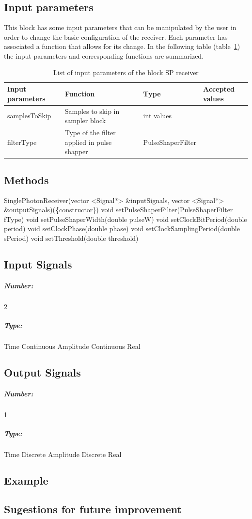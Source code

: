 \subsection*{Input parameters}

This block has some input parameters that can be manipulated by the user in order to change the basic configuration of the receiver. Each parameter has associated a function that allows for its change. In the following table (table~\ref{table}) the input parameters and corresponding functions are summarized.

\begin{table}[h]
	\begin{center}
		\begin{tabular}{| m{} | m{} |  m{} | m{4cm} | }
			\hline
			\textbf{Input parameters} & \textbf{Function} & Type & \textbf{Accepted values} \\ \hline
			samplesToSkip            & Samples to skip in sampler block & int values\\
            filterType                  & Type of the filter applied in pulse shapper & PulseShaperFilter \\

			\hline
		\end{tabular}
		\caption{List of input parameters of the block SP receiver} \label{table}
	\end{center}
\end{table}

\pagebreak

\subsection*{Methods}

SinglePhotonReceiver(vector <Signal*> \&inputSignals, vector <Signal*> \&outputSignals)(\textbf\{constructor\})
\bigbreak
void setPulseShaperFilter(PulseShaperFilter fType)
\bigbreak
void setPulseShaperWidth(double pulseW)
\bigbreak
void setClockBitPeriod(double period)
\bigbreak
void setClockPhase(double phase)
\bigbreak
void setClockSamplingPeriod(double sPeriod)
\bigbreak
void setThreshold(double threshold)

\pagebreak

\subsection*{Input Signals}

\subparagraph*{Number:} 2

\subparagraph*{Type:} Time Continuous Amplitude Continuous Real

\subsection*{Output Signals}

\subparagraph*{Number:} 1

\subparagraph*{Type:} Time Discrete Amplitude Discrete Real

\subsection*{Example}

\subsection*{Sugestions for future improvement}
